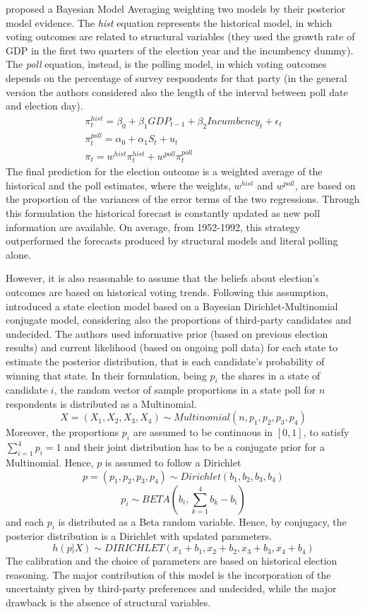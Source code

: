 \documentclass[
  12pt]{article}
\begin{document}
\citet{bro:cha:1999} proposed a Bayesian Model Averaging weighting two
models by their posterior model evidence. The \emph{hist} equation
represents the historical model, in which voting outcomes are related to
structural variables (they used the growth rate of GDP in the first two
quarters of the election year and the incumbency dummy). The \emph{poll}
equation, instead, is the polling model, in which voting outcomes
depends on the percentage of survey respondents for that party (in the
general version the authors considered also the length of the interval
between poll date and election day). \[
\begin{aligned}
\pi_{t}^{hist} = \beta_0 + \beta_1 GDP_{t-1} + \beta_2 Incumbency_t + \epsilon_t \\
\pi_{t}^{poll} = \alpha_0 + \alpha_1 S_t + u_t \;\;\;\;\;\;\;\;\;\;\;\;\;\;\;\; \\
\pi_{t} =  w^{hist} \pi_{t}^{hist} + w^{poll} \pi_{t}^{poll} \;\;\;\;\;\;\;\;\;\;\;\;\; 
\end{aligned}
\] The final prediction for the election outcome is a weighted average
of the historical and the poll estimates, where the weights,
\(w^{hist}\) and \(w^{poll}\), are based on the proportion of the
variances of the error terms of the two regressions. Through this
formulation the historical forecast is constantly updated as new poll
information are available. On average, from 1952-1992, this strategy
outperformed the forecasts produced by structural models and literal
polling alone.

However, it is also reasonable to assume that the beliefs about
election's outcomes are based on historical voting trends. Following
this assumption, \citet{rig:2009} introduced a state election model
based on a Bayesian Dirichlet-Multinomial conjugate model, considering
also the proportions of third-party candidates and undecided. The
authors used informative prior (based on previous election results) and
current likelihood (based on ongoing poll data) for each state to
estimate the posterior distribution, that is each candidate's
probability of winning that state. In their formulation, being \(p_i\)
the shares in a state of candidate \(i\), the random vector of sample
proportions in a state poll for \(n\) respondents is distributed as a
Multinomial.
\[X = (X_1, X_2, X_3, X_4) \sim Multinomial(n, p_1, p_2, p_3, p_4)\]
Moreover, the proportions \(p_i\) are assumed to be continuous in
\([0,1]\), to satisfy \(\sum_{i = 1}^{4} p_i = 1\) and their joint
distribution has to be a conjugate prior for a Multinomial. Hence, \(p\)
is assumed to follow a Dirichlet
\[p = (p_1, p_2, p_3, p_4) \sim Dirichlet(b_1, b_2, b_3, b_4)\]
\[p_i \sim BETA(b_i, \sum_{k = 1}^{4} b_k - b_i)\] and each \(p_i\) is
distributed as a Beta random variable. Hence, by conjugacy, the
posterior distribution is a Dirichlet with updated parameters.
\[h(p|X) \sim DIRICHLET(x_1 + b_1, x_2 + b_2, x_3 + b_3, x_4 + b_4)\]
The calibration and the choice of parameters are based on historical
election reasoning. The major contribution of this model is the
incorporation of the uncertainty given by third-party preferences and
undecided, while the major drawback is the absence of structural
variables.
\end{document}
